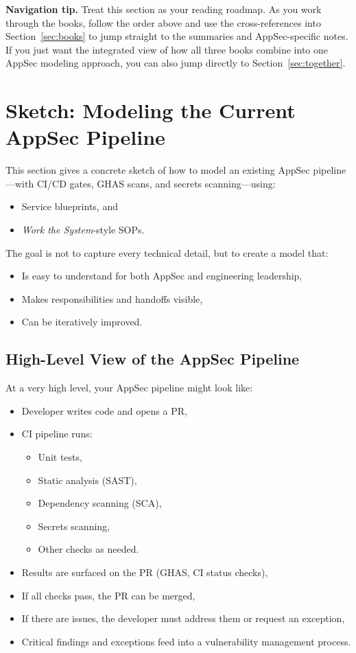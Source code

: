 \documentclass[11pt]{article}
\begin{document}
\medskip

\textbf{Navigation tip.} Treat this section as your reading roadmap.
As you work through the books, follow the order above and use the
cross-references into Section~\ref{sec:books} to jump straight to the
summaries and AppSec-specific notes. If you just want the integrated
view of how all three books combine into one AppSec modeling approach,
you can also jump directly to Section~\ref{sec:together}.
\clearpage
\section{Sketch: Modeling the Current AppSec Pipeline}
\label{sec:pipeline-sketch}

This section gives a concrete sketch of how to model
an existing AppSec pipeline---with CI/CD gates, GHAS scans,
and secrets scanning---using:

\begin{itemize}
  \item Service blueprints, and
  \item \emph{Work the System}-style SOPs.
\end{itemize}

The goal is not to capture every technical detail, but to
create a model that:
\begin{itemize}
  \item Is easy to understand for both AppSec and engineering leadership,
  \item Makes responsibilities and handoffs visible,
  \item Can be iteratively improved.
\end{itemize}

\subsection{High-Level View of the AppSec Pipeline}

At a very high level, your AppSec pipeline might look like:

\begin{itemize}
  \item Developer writes code and opens a PR,
  \item CI pipeline runs:
        \begin{itemize}
          \item Unit tests,
          \item Static analysis (SAST),
          \item Dependency scanning (SCA),
          \item Secrets scanning,
          \item Other checks as needed.
        \end{itemize}
  \item Results are surfaced on the PR (GHAS, CI status checks),
  \item If all checks pass, the PR can be merged,
  \item If there are issues, the developer must address them
        or request an exception,
  \item Critical findings and exceptions feed into a vulnerability
        management process.
\end{itemize}
\end{document}
